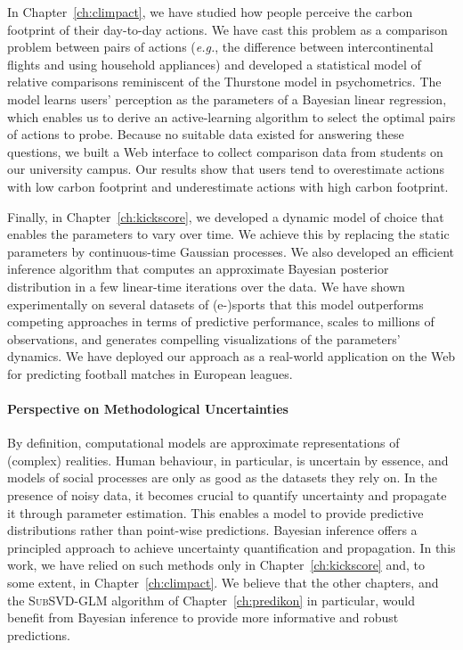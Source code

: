 In Chapter~\ref{ch:climpact}, we have studied how people perceive the carbon footprint of their day-to-day actions.
We have cast this problem as a comparison problem between pairs of actions (\textit{e.g.}, the difference between intercontinental flights and using household appliances) and developed a statistical model of relative comparisons reminiscent of the Thurstone model in psychometrics.
The model learns users' perception as the parameters of a Bayesian linear regression, which enables us to derive an active-learning algorithm to select the optimal pairs of actions to probe.
Because no suitable data existed for answering these questions, we built a Web interface to collect comparison data from students on our university campus.
Our results show that users tend to overestimate actions with low carbon footprint and underestimate actions with high carbon footprint.

Finally, in Chapter~\ref{ch:kickscore}, we developed a dynamic model of choice that enables the parameters to vary over time.
We achieve this by replacing the static parameters by continuous-time Gaussian processes.
We also developed an efficient inference algorithm that computes an approximate Bayesian posterior distribution in a few linear-time iterations over the data.
We have shown experimentally on several datasets of (e-)sports that this model outperforms competing approaches in terms of predictive performance, scales to millions of observations, and generates compelling visualizations of the parameters' dynamics.
We have deployed our approach as a real-world application on the Web for predicting football matches in European leagues.

\paragraph{Perspective on Methodological Uncertainties}

By definition, computational models are approximate representations of (complex) realities.
Human behaviour, in particular, is uncertain by essence, and models of social processes are only as good as the datasets they rely on.
In the presence of noisy data, it becomes crucial to quantify uncertainty and propagate it through parameter estimation.
This enables a model to provide predictive distributions rather than point-wise predictions.
Bayesian inference offers a principled approach to achieve uncertainty quantification and propagation.
In this work, we have relied on such methods only in Chapter~\ref{ch:kickscore} and, to some extent, in Chapter~\ref{ch:climpact}.
We believe that the other chapters, and the \textsc{SubSVD-GLM} algorithm of Chapter~\ref{ch:predikon} in particular, would benefit from Bayesian inference to provide more informative and robust predictions.


